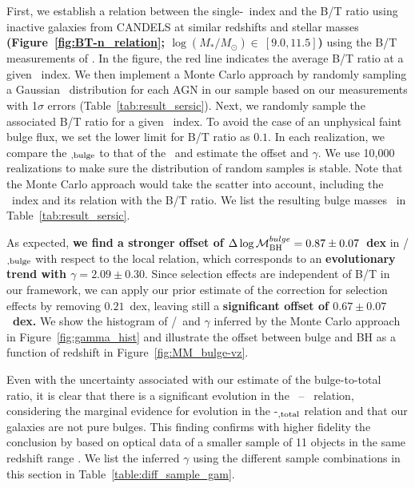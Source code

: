 \documentclass[apj]{emulateapj}
\begin{document}
First, we establish a relation between the single-\sersic\ index and the B/T ratio using inactive galaxies from CANDELS at similar redshifts and stellar masses {\bf (Figure~\ref{fig:BT-n_relation}; $\log (M_*/M_{\odot})\in~ [9.0, 11.5]$)} using the B/T measurements of \citet{Dimauro2018}. In the figure, the red line indicates the average B/T ratio at a given \sersic\ index. We then implement a Monte Carlo approach by randomly sampling a Gaussian \sersic\ distribution for each AGN in our sample based on our measurements with 1$\sigma$ errors (Table~\ref{tab:result_sersic}). Next, we randomly sample the associated B/T ratio for a given \sersic\ index. To avoid the case of an unphysical faint bulge flux, we set the lower limit for B/T ratio as $0.1$. In each realization, we compare the \smass$_{\rm, bulge}$ to that of the \mbh\ and estimate the offset and $\gamma$.  We use 10,000 realizations to make sure the distribution of random samples is stable. Note that the Monte Carlo approach would take the scatter into account, including the \sersic\ index and its relation with the B/T ratio. We list the resulting bulge masses \bmass\ in Table~\ref{tab:result_sersic}.

As expected, {\bf we find a stronger offset of
$\Delta \log \mathcal M_{\rm BH}^{bulge} = 0.87\pm0.07$~dex } in \mbh/\smass$_{\rm, bulge}$ with respect to the
local relation, which corresponds to an {\bf evolutionary trend with
$\gamma = 2.09\pm0.30$}. Since selection effects are independent of B/T in
our framework, we can apply our prior estimate of the correction for selection effects by removing $0.21$~dex, leaving still a {\bf significant offset
of $0.67\pm0.07$~dex.} We show the histogram of  \mbh/\smass\ and $\gamma$ inferred by
the Monte Carlo approach in Figure~\ref{fig:gamma_hist} and illustrate the offset between bulge and BH
as a function of redshift in Figure~\ref{fig:MM_bulge-vz}.

Even with the uncertainty associated with our estimate of the
bulge-to-total ratio, it is clear that there is a significant evolution
in the \mbh\ -- \bmass\ relation, considering the
marginal evidence for evolution in the \mbh-\smass$_{\rm, total}$
relation and that our galaxies are not pure bulges. This finding
confirms with higher fidelity the conclusion by \citet{Bennert11}
based on optical data of a smaller sample of 11 objects in the same
redshift range \citep[see][for similar results]{SS13, Jah++09, Cisternas2011}. We list the inferred $\gamma$ using the different sample combinations in this section in
Table~\ref{table:diff_sample_gam}.
\end{document}
